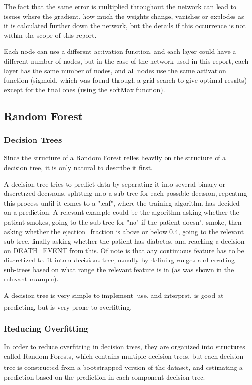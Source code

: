 \documentclass[a4paper, UKenglish]{article}
\newcommand{\0}{\mathbf{0}}
\newcommand{\1}{\mathbf{1}}
\newcommand{\citesup}[1]{\textsuperscript{\cite{#1}}}
\begin{document}
The fact that the same error is multiplied throughout the network can lead to issues where the gradient, how much the weights change, vanishes or explodes as it is calculated further down the network, but the details if this occurrence is not within the scope of this report.

Each node can use a different activation function, and each layer could have a different number of nodes, but in the case of the network used in this report, each layer has the same number of nodes, and all nodes use the same activation function (sigmoid, which was found through a grid search to give optimal results) except for the final ones (using the softMax function).

\subsection{Random Forest}
\subsubsection{Decision Trees}
Since the structure of a Random Forest relies heavily on the structure of a decision tree, it is only natural to describe it first.

A decision tree tries to predict data by separating it into several binary or discretized decisions, splitting into a sub-tree for each possible decision, repeating this process until it comes to a "leaf", where the training algorithm has decided on a prediction. A relevant example could be the algorithm asking whether the patient smokes, going to the sub-tree for "no" if the patient doesn't smoke, then asking whether the ejection\_fraction is above or below 0.4, going to the relevant sub-tree, finally asking whether the patient has diabetes, and reaching a decision on DEATH\_EVENT from this. Of note is that any continuous feature has to be discretized to fit into a decisions tree, usually by defining ranges and creating sub-trees based on what range the relevant feature is in (as was shown in the relevant example).

A decision tree is very simple to implement, use, and interpret, is good at predicting, but is very prone to overfitting\citesup{Flom_2019}. 

\subsubsection{Reducing Overfitting}
In order to reduce overfitting in decision trees, they are organized into structures called Random Forests, which contains multiple decision trees, but each decision tree is constructed from a bootstrapped\citesup{project_1} version of the dataset, and estimating a prediction based on the prediction in each component decision tree.
\end{document}
